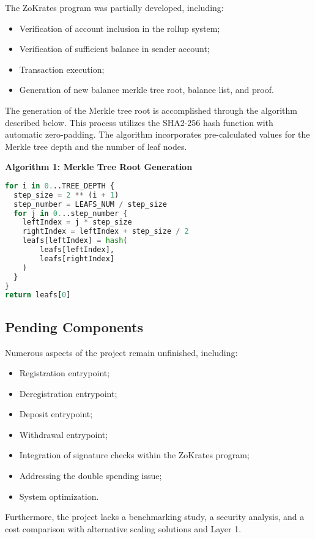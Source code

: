 The ZoKrates program was partially developed, including:
\begin{itemize}
    \item Verification of account inclusion in the rollup system;
    \item Verification of sufficient balance in sender account;
    \item Transaction execution;
    \item Generation of new balance merkle tree root, balance list, and proof.
\end{itemize}

The generation of the Merkle tree root is accomplished through the algorithm described below. This process utilizes the SHA2-256 hash function with automatic zero-padding. The algorithm incorporates pre-calculated values for the Merkle tree depth and the number of leaf nodes.

\noindent\textbf{Algorithm 1: Merkle Tree Root Generation}
\begin{lstlisting}[language=Python]
for i in 0...TREE_DEPTH {
  step_size = 2 ** (i + 1)
  step_number = LEAFS_NUM / step_size
  for j in 0...step_number {
    leftIndex = j * step_size
    rightIndex = leftIndex + step_size / 2
    leafs[leftIndex] = hash(
        leafs[leftIndex],
        leafs[rightIndex]
    )
  }
}
return leafs[0]
\end{lstlisting}

\subsection{Pending Components\label{subsec:pendingcomponents}}
Numerous aspects of the project remain unfinished, including:
\begin{itemize}
  \item Registration entrypoint;
  \item Deregistration entrypoint;
  \item Deposit entrypoint;
  \item Withdrawal entrypoint;
  \item Integration of signature checks within the ZoKrates program;
  \item Addressing the double spending issue;
  \item System optimization.
\end{itemize}
Furthermore, the project lacks a benchmarking study, a security analysis, and a cost comparison with alternative scaling solutions and Layer 1.



